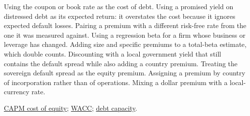 \begin{qfmethod}
 Using the coupon or book rate as the cost of debt. Using a promised yield on distressed debt as its expected return: it overstates the cost because it ignores expected default losses. Pairing a premium with a different risk-free rate from the one it was measured against. Using a regression beta for a firm whose business or leverage has changed. Adding size and specific premiums to a total-beta estimate, which double counts. Discounting with a local government yield that still contains the default spread while also adding a country premium. Treating the sovereign default spread as the equity premium. Assigning a premium by country of incorporation rather than of operations. Mixing a dollar premium with a local-currency rate.

 \hyperref[meth:required-return-on-equity]{CAPM cost of equity}; \hyperref[meth:wacc-calculation]{WACC}; \hyperref[meth:capital-structure-benchmarking]{debt capacity}.

\end{qfmethod}

